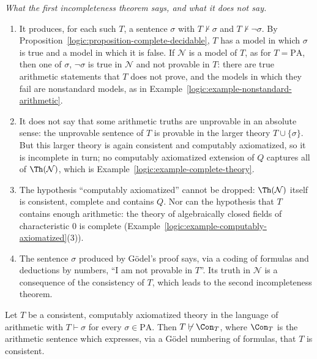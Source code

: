 \begin{remark}\label{logic:remark-reading-incompleteness}
\emph{What the first incompleteness theorem says, and what it does not say.}
\begin{enumerate}
\item It produces, for each such $T$, a sentence $\sigma$ with $T \not\vdash \sigma$ and $T \not\vdash \neg\sigma$. By Proposition~\ref{logic:proposition-complete-decidable}, $T$ has a model in which
$\sigma$ is true and a model in which it is false. If $\mathcal{N}$ is a model of $T$, as for $T = \mathrm{PA}$, then one of $\sigma$, $\neg\sigma$ is true in $\mathcal{N}$ and not provable in $T$:
there are true arithmetic statements that $T$ does not prove, and the models in which they fail are nonstandard models, as in Example~\ref{logic:example-nonstandard-arithmetic}.
\item It does not say that some arithmetic truths are unprovable in an absolute sense: the unprovable sentence of $T$ is provable in the larger theory $T \cup \{\sigma\}$. But this
larger theory is again consistent and computably axiomatized, so it is incomplete in turn; no computably axiomatized extension of $Q$ captures all of $\Th(\mathcal{N})$, which is
Example~\ref{logic:example-complete-theory}.
\item The hypothesis ``computably axiomatized'' cannot be dropped: $\Th(\mathcal{N})$ itself is consistent, complete and contains $Q$. Nor can the hypothesis that $T$ contains
enough arithmetic: the theory of algebraically closed fields of characteristic $0$ is complete (Example~\ref{logic:example-computably-axiomatized}(3)).
\item The sentence $\sigma$ produced by G\"odel's proof says, via a coding of formulas and deductions by numbers, ``I am not provable in $T$''. Its truth in $\mathcal{N}$ is a
consequence of the consistency of $T$, which leads to the second incompleteness theorem.
\end{enumerate}
\end{remark}

\begin{theorem}\label{logic:theorem-second-incompleteness}
Let $T$ be a consistent, computably axiomatized theory in the language of
arithmetic with $T \vdash \sigma$ for every $\sigma \in \mathrm{PA}$. Then
$T \not\vdash \Con_T$, where $\Con_T$ is the arithmetic sentence which
expresses, via a G\"odel numbering of formulas, that $T$ is consistent.
\end{theorem}


